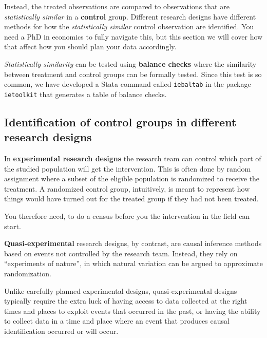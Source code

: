 Instead, the treated observations are compared to observations
that are \textit{statistically similar} in a \textbf{control} group. 
Different research designs have different methods 
for how the \textit{statistically similar} control observation are identified. 
You need a PhD in economics to fully navigate this, 
but this section we will cover how that affect how you should plan your data accordingly.

\textit{Statistically similarity} can be tested using \textbf{balance checks} 
where the similarity between treatment and control groups can be formally tested. 
Since this test is so common, 
we have developed a Stata command called \texttt{iebaltab}
 in the package \texttt{ietoolkit} that generates a table of balance checks.


\subsection{Identification of control groups in different research designs}


In \textbf{experimental research designs} the research team can control which part of the studied population will get the intervention. This is often done by random assignment
where a subset of the eligible population is randomized to receive the treatment. 
A randomized control group, intuitively, is meant to represent
how things would have turned out for the treated group
if they had not been treated.

You therefore need, to do a census before you the intervention in the field can start. 


\textbf{Quasi-experimental} research designs,
by contrast, are causal inference methods based on events not controlled by the research team. Instead, they rely on ``experiments of nature'',
in which natural variation can be argued to approximate randomization. 

Unlike carefully planned experimental designs,
quasi-experimental designs typically require the extra luck
of having access to data collected at the right times and places
to exploit events that occurred in the past,
or having the ability to collect data in a time and place
where an event that produces causal identification occurred or will occur.

